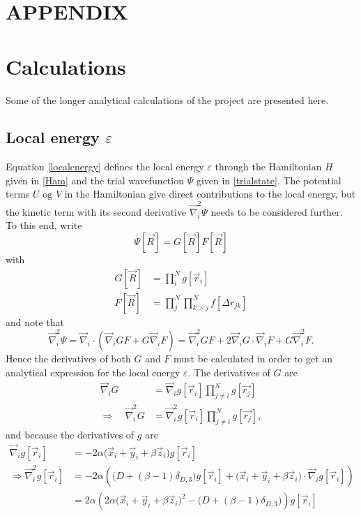 \documentclass[a4paper,8pt]{article}
\begin{document}
\newpage
\appendix
\setcounter{equation}{0}
\renewcommand{\theequation}{\thesection\arabic{equation}}
\section*{APPENDIX}
\section{Calculations}
Some of the longer analytical calculations of the project are presented here.


\subsection{Local energy $\varepsilon$}\label{derLocalenergy}
Equation \eqref{localenergy} defines the local energy $\varepsilon$ through the Hamiltonian $H$ given in \eqref{Ham} and the trial wavefunction $\Psi$ given in \eqref{trialstate}. The potential terms $U$ og $V$ in the Hamiltonian give direct contributions to the local energy, but the kinetic term with its second derivative $\vec{\nabla}_i^2\Psi$ needs to be considered further. To this end, write
\begin{equation}
\Psi[\vec{R}] = G[\vec{R}]F[\vec{R}]
\end{equation}
with
\begin{align}
G[\vec{R}] &= \prod\limits_i^N g[\vec{r}_i] \label{G}\\
F[\vec{R}] &= \prod\limits_j^N\prod\limits_{k > j}^N f[\Delta{r}_{jk}] \label{F}
\end{align}
and note that
\begin{equation}
\vec{\nabla}_i^2\Psi = \vec{\nabla}_i\cdot\left(\vec{\nabla}_i G F + G \vec{\nabla}_i F\right) = \vec{\nabla}_i^2 G F + 2\vec{\nabla}_i G \cdot \vec{\nabla}_i F + G \vec{\nabla}_i^2 F. \label{Lap_Psi_1} 
\end{equation}
Hence the derivatives of both $G$ and $F$ must be calculated in order to get an analytical expression for the local energy $\varepsilon$. The derivatives of $G$ are 
\begin{align}
\vec{\nabla}_i G &= \vec{\nabla}_i g[\vec{r}_i] \prod\limits_{j \neq i}^N g[\vec{r_j}] \nonumber\\
\Longrightarrow\quad \vec{\nabla}_i^2 G &= \vec{\nabla}_i^2 g[\vec{r}_i] \prod\limits_{j \neq i}^N g[\vec{r_j}], \nonumber
\end{align}
and because the derivatives of $g$ are
\begin{align}
\vec{\nabla}_i g[\vec{r}_i] &= -2\alpha\Big(\vec{x}_i+\vec{y}_i+\beta\vec{z}_i\Big)g[\vec{r}_i] \\
\Longrightarrow \vec{\nabla}_i^2 g[\vec{r}_i] &= -2\alpha\left(\Big(D+(\beta-1)\delta_{D,3}\Big)g[\vec{r}_i]+\Big(\vec{x}_i+\vec{y}_i+\beta\vec{z}_i\Big)\cdot\vec{\nabla}_i g[\vec{r}_i]\right) \nonumber\\
&= 2\alpha\left(2\alpha\Big(\vec{x}_i+\vec{y}_i+\beta\vec{z}_i\Big)^2-\Big(D+(\beta-1)\delta_{D,3}\Big)\right)g[\vec{r}_i]
\end{align}
\end{document}

